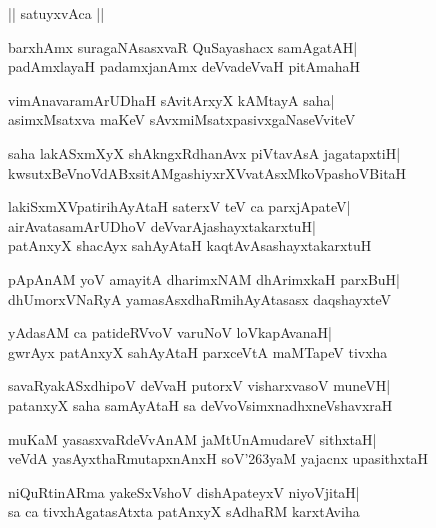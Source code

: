\documentclass[twoside,12pt,openright]{book}
\def\S{\char'263}
\newcounter{shloka}[chapter]
\begin{document}
\begin{center}
|| satuyxvAca ||
\end{center}
\begin{shloka}%
barxhAmx suragaNAsasxvaR QuSayashacx samAgatAH|\\
padAmxlayaH padamxjanAmx deVvadeVvaH pitAmahaH
\end{shloka}

\begin{shloka}%
vimAnavaramArUDhaH sAvitArxyX kAMtayA saha|\\
asimxMsatxva maKeV sAvxmiMsatxpasivxgaNaseVviteV
\end{shloka}

\begin{shloka}%
saha lakASxmXyX shAkngxRdhanAvx piVtavAsA jagatapxtiH|\\
kwsutxBeVnoVdABxsitAMgashiyxrXVvatAsxMkoVpashoVBitaH
\end{shloka}

\begin{shloka}%
lakiSxmXVpatirihAyAtaH saterxV teV ca parxjApateV|\\
airAvatasamArUDhoV deVvarAjashayxtakarxtuH|\\
patAnxyX shacAyx sahAyAtaH kaqtAvAsashayxtakarxtuH
\end{shloka}

\begin{shloka}%
pApAnAM yoV amayitA dharimxNAM dhArimxkaH parxBuH|\\
dhUmorxVNaRyA yamasAsxdhaRmihAyAtasasx daqshayxteV
\end{shloka}

\begin{shloka}%
yAdasAM ca patideRVvoV varuNoV loVkapAvanaH|\\
gwrAyx patAnxyX sahAyAtaH parxceVtA maMTapeV tivxha
\end{shloka}

\begin{shloka}%
savaRyakASxdhipoV deVvaH putorxV visharxvasoV muneVH|\\
patanxyX saha samAyAtaH sa deVvoVsimxnadhxneVshavxraH
\end{shloka}

\begin{shloka}%
muKaM yasasxvaRdeVvAnAM jaMtUnAmudareV sithxtaH|\\
veVdA yasAyxthaRmutapxnAnxH soV\S yaM yajacnx upasithxtaH
\end{shloka}

\begin{shloka}%
niQuRtinARma yakeSxVshoV dishApateyxV niyoVjitaH|\\
sa ca tivxhAgatasAtxta patAnxyX sAdhaRM karxtAviha
\end{shloka}
\end{document}
